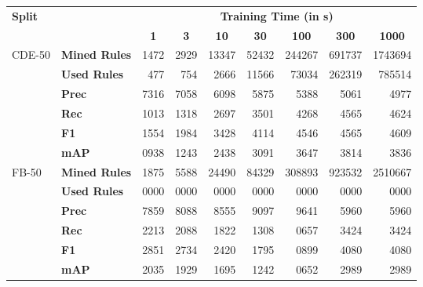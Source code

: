 \begin{tabular}{| l | l | r | r | r | r | r | r | r |}
    \hline

    \multirow{2}{*}{\textbf{Split}} &
    &
    \multicolumn{7}{|c|}{\textbf{Training Time (in s)}} \\

    &
    &
    \multicolumn{1}{|c|}{\textbf{1}} &
    \multicolumn{1}{|c|}{\textbf{3}} &
    \multicolumn{1}{|c|}{\textbf{10}} &
    \multicolumn{1}{|c|}{\textbf{30}} &
    \multicolumn{1}{|c|}{\textbf{100}} &
    \multicolumn{1}{|c|}{\textbf{300}} &
    \multicolumn{1}{|c|}{\textbf{1000}} \\

    \hline \hline

    \multirow{6}{*}{CDE-50}
    & \textbf{Mined Rules} & \num{1472}  & \num{2929} & \num{13347} & \num{52432}  & \num{244267}  & \num{691737}  & \num{1743694} \\
    & \textbf{Used Rules}  & \num{477}  & \num{754}  & \num{2666}  & \num{11566} & \num{73034} & \num{262319} & \num{785514}  \\
    & \textbf{Prec}        & 7316       & 7058       & 6098        & 5875        & 5388        & 5061        & 4977         \\
    & \textbf{Rec}         & 1013       & 1318       & 2697        & 3501        & 4268        & 4565        & 4624         \\
    & \textbf{F1}          & 1554       & 1984       & 3428        & 4114        & 4546        & 4565        & 4609         \\
    & \textbf{mAP}         & 0938       & 1243       & 2438        & 3091        & 3647        & 3814        & 3836         \\

    \hline

    \multirow{6}{*}{FB-50}
    & \textbf{Mined Rules} & \num{1875} & \num{5588} & \num{24490} & \num{84329}   & \num{308893} & \num{923532}  & \num{2510667} \\
    & \textbf{Used Rules}  & \num{0000} & \num{0000} & \num{0000} & \num{0000}   & \num{0000}  & \num{0000} & \num{0000}\\
    & \textbf{Prec}        & 7859       & 8088       & 8555        & 9097        & 9641         & 5960        & 5960       \\
    & \textbf{Rec}         & 2213       & 2088       & 1822        & 1308        & 0657         & 3424        & 3424       \\
    & \textbf{F1}          & 2851       & 2734       & 2420        & 1795        & 0899         & 4080        & 4080       \\
    & \textbf{mAP}         & 2035       & 1929       & 1695        & 1242        & 0652         & 2989        & 2989       \\

    \hline
\end{tabular}
